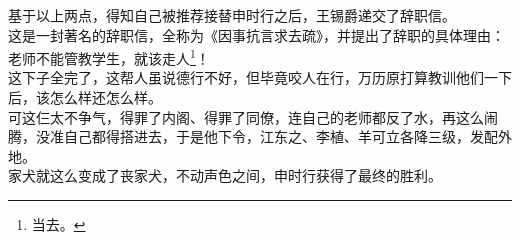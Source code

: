 \begin{multicols}{\theparacolNo}
基于以上两点，得知自己被推荐接替申时行之后，王锡爵递交了辞职信。\\

这是一封著名的辞职信，全称为《因事抗言求去疏》，并提出了辞职的具体理由：\\

老师不能管教学生，就该走人\footnote{当去。}！\\

这下子全完了，这帮人虽说德行不好，但毕竟咬人在行，万历原打算教训他们一下后，该怎么样还怎么样。\\

可这仨太不争气，得罪了内阁、得罪了同僚，连自己的老师都反了水，再这么闹腾，没准自己都得搭进去，于是他下令，江东之、李植、羊可立各降三级，发配外地。\\

家犬就这么变成了丧家犬，不动声色之间，申时行获得了最终的胜利。\\
\ifnum{}
	\end{multicols}
\fi
\newpage

